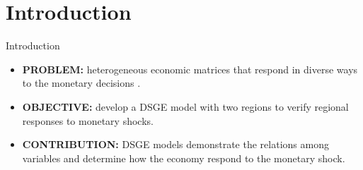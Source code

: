 \documentclass[../quali_slides.tex]{subfiles}
\begin{document}
	
\section{Introduction}


\begin{frame}{Introduction}
	
	\begin{itemize}
		
		\item \textbf{PROBLEM:} heterogeneous economic matrices that respond in diverse ways to the monetary decisions \cite{bertanha_efeitos_2008}.
		
		\item \textbf{OBJECTIVE:} develop a DSGE model with two regions to verify regional responses to monetary shocks.
		
		\item \textbf{CONTRIBUTION:} DSGE models demonstrate the relations among variables and determine how the economy respond to the monetary shock.
		
	\end{itemize}
	
	
\end{frame}
\end{document}
